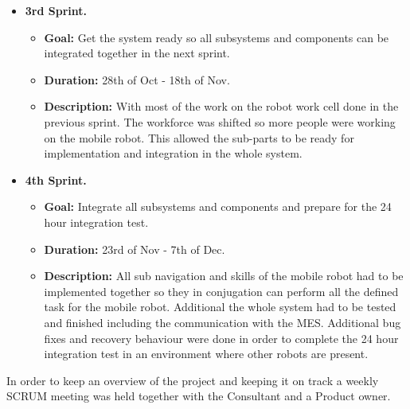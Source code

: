 \begin{itemize}
    \item \textbf{3rd Sprint.}
    \begin{itemize}
    	\item \textbf{Goal:} Get the system ready so all subsystems and components can be integrated together in the next sprint.
    	\item \textbf{Duration:} 28th of Oct - 18th of Nov.
    	\item \textbf{Description:} With most of the work on the robot work cell done in the previous sprint. The workforce was shifted so more people were working on the mobile robot. This allowed the sub-parts to be ready for implementation and integration in the whole system.
	\end{itemize}
	
    \item \textbf{4th Sprint.}
    \begin{itemize}
    	\item \textbf{Goal:} Integrate all subsystems and components and prepare for the 24 hour integration test.
    	\item \textbf{Duration:} 23rd of Nov - 7th of Dec.
    	\item \textbf{Description:} All sub navigation and skills of the mobile robot had to be implemented together so they in conjugation can perform all the defined task for the mobile robot. Additional the whole system had to be tested and finished including the communication with the MES. Additional bug fixes and recovery behaviour were done in order to complete the 24 hour integration test in an environment where other robots are present.
	\end{itemize}
\end{itemize}

In order to keep an overview of the project and keeping it on track a weekly SCRUM meeting was held together with the Consultant and a Product owner.